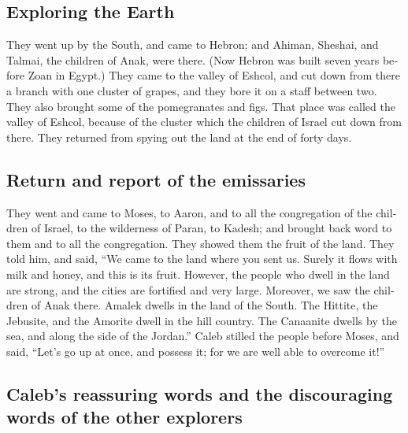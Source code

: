 \begin{paracol}{2}
\begin{otherlanguage}{english}
\hypertarget{exploring-the-earth}{%
\subsection{Exploring the Earth}\label{exploring-the-earth}}

 They went up by the South, and came to Hebron; and
Ahiman, Sheshai, and Talmai, the children of Anak, were there. (Now
Hebron was built seven years before Zoan in Egypt.)  They
came to the valley of Eshcol, and cut down from there a branch with one
cluster of grapes, and they bore it on a staff between two. They also
brought some of the pomegranates and figs.  That place
was called the valley of Eshcol, because of the cluster which the
children of Israel cut down from there.  They returned
from spying out the land at the end of forty days.

\hypertarget{return-and-report-of-the-emissaries}{%
\subsection{Return and report of the
emissaries}\label{return-and-report-of-the-emissaries}}

 They went and came to Moses, to Aaron, and to all the
congregation of the children of Israel, to the wilderness of Paran, to
Kadesh; and brought back word to them and to all the congregation. They
showed them the fruit of the land.  They told him, and
said, ``We came to the land where you sent us. Surely it flows with milk
and honey, and this is its fruit.  However, the people
who dwell in the land are strong, and the cities are fortified and very
large. Moreover, we saw the children of Anak there. 
Amalek dwells in the land of the South. The Hittite, the Jebusite, and
the Amorite dwell in the hill country. The Canaanite dwells by the sea,
and along the side of the Jordan.''  Caleb stilled the
people before Moses, and said, ``Let's go up at once, and possess it;
for we are well able to overcome it!''

\hypertarget{calebs-reassuring-words-and-the-discouraging-words-of-the-other-explorers}{%
\subsection{Caleb's reassuring words and the discouraging words of the
other
explorers}\label{calebs-reassuring-words-and-the-discouraging-words-of-the-other-explorers}}


\end{otherlanguage}
\end{paracol}

